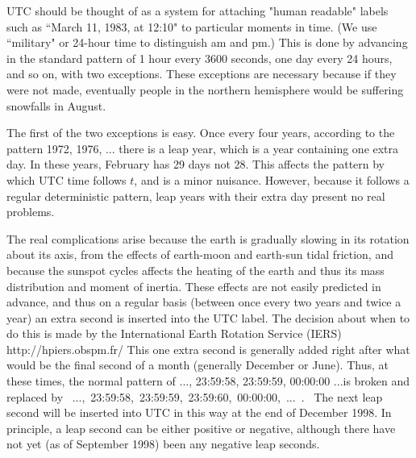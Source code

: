 UTC should be thought of as a system for attaching "human readable"
labels such as ``March 11, 1983, at 12:10" to particular moments in time.
(We use ``military" or 24-hour time to distinguish am and pm.)  This is
done by advancing in the standard pattern of 1 hour every 3600 seconds,
one day every 24 hours, and so on, with two exceptions.  These exceptions
are necessary because if they were not made, eventually people in the
northern hemisphere would be suffering snowfalls in August.

The first of the two exceptions is easy.  Once every four years, according
to the pattern 1972, 1976, ... there is a leap year, which is a year
containing one extra day.  In these years, February has 29 days not 28.
This affects the pattern by which UTC time follows $t$, and is a minor
nuisance.  However, because it follows a regular deterministic pattern,
leap years with their extra day present no real problems.

The real complications arise because the earth is gradually slowing
in its rotation about its axis, from the effects of earth-moon and
earth-sun tidal friction, and because the sunspot cycles affects the
heating of the earth and thus its mass distribution and moment of
inertia.  These effects are not easily predicted in advance, and thus
on a regular basis (between once every two years and twice a year) an
extra second is inserted into the UTC label.  The decision about when
to do this is made by the International Earth Rotation Service (IERS)
{http://hpiers.obspm.fr/}
This one extra second is generally added
right after what would be the final second of a month (generally December
or June).  Thus, at these times, the normal pattern of ..., 23:59:58,
23:59:59, 00:00:00 ...is broken and replaced by
\hbox{ ..., 23:59:58, 23:59:59,
23:59:60, 00:00:00, ... .  } The next leap second will be inserted into
UTC in this way at the end of December 1998.  In principle, a leap
second can be either positive or negative, although there have not yet
(as of September 1998) been any negative leap seconds.

